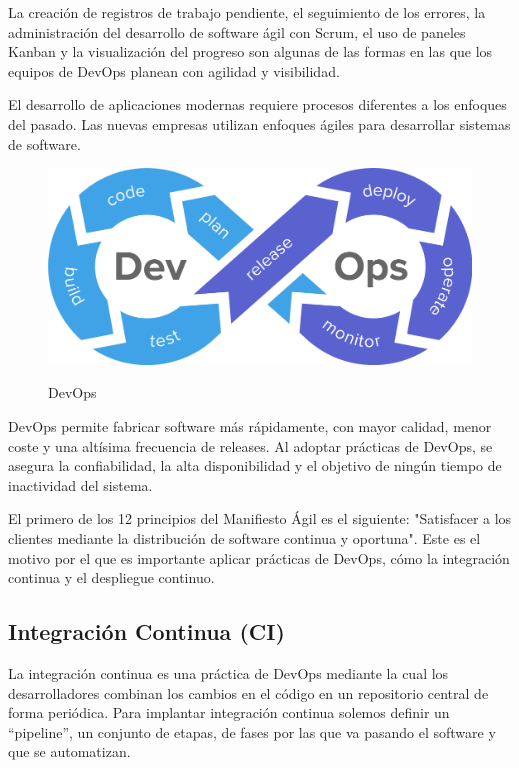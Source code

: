 \documentclass[12pt,twoside,titlepage]{report}
\begin{document}
La creación de registros de trabajo pendiente, el seguimiento de los errores, la administración del desarrollo de software ágil con Scrum, el uso de paneles Kanban y la visualización del progreso son algunas de las formas en las que los equipos de DevOps planean con agilidad y visibilidad.

El desarrollo de aplicaciones modernas requiere procesos diferentes a los enfoques del pasado. Las nuevas empresas utilizan enfoques ágiles para desarrollar sistemas de software.

\begin{figure}[H]
    \centering
    \includegraphics[scale=0.24]{DevOps/DevOps}
    \label{fig:DevOps}
    \caption{DevOps}
\end{figure}

DevOps permite fabricar software más rápidamente, con mayor calidad, menor coste y una altísima frecuencia de releases. Al adoptar prácticas de DevOps, se asegura la confiabilidad, la alta disponibilidad y el objetivo de ningún tiempo de inactividad del sistema.

El primero de los 12 principios del Manifiesto Ágil es el siguiente: "Satisfacer a los clientes mediante la distribución de software continua y oportuna". Este es el motivo por el que es importante aplicar prácticas de DevOps, cómo la integración continua y el despliegue continuo.

\subsection{Integración Continua (CI)}

La integración continua es una práctica de DevOps mediante la cual los desarrolladores combinan los cambios en el código en un repositorio central de forma periódica. Para implantar integración continua solemos definir un “pipeline”, un conjunto de etapas, de fases por las que va pasando el software y que se automatizan. 
\end{document}
